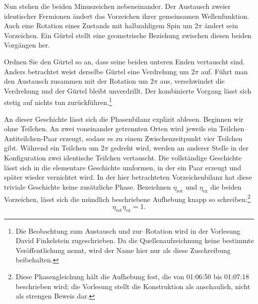 Nun stehen die beiden Minuszeichen nebeneinander. Der Austausch zweier identischer Fermionen ändert das Vorzeichen ihrer gemeinsamen Wellenfunktion. Auch eine Rotation eines Zustands mit halbzahligem Spin um \(2\pi\) ändert sein Vorzeichen. Ein Gürtel stellt eine geometrische Beziehung zwischen diesen beiden Vorgängen her.

Ordnen Sie den Gürtel so an, dass seine beiden unteren Enden vertauscht sind. Anders betrachtet weist derselbe Gürtel eine Verdrehung um \(2\pi\) auf. Führt man den Austausch zusammen mit der Rotation um \(2\pi\) aus, verschwindet die Verdrehung und der Gürtel bleibt unverdrillt. Der kombinierte Vorgang lässt sich stetig auf nichts tun zurückführen.\footnote{Die Beobachtung zum Austausch und zur--Rotation wird in der Vorlesung David Finkelstein zugeschrieben. Da die Quellenaufzeichnung keine bestimmte Veröffentlichung nennt, wird der Name hier nur als diese Zuschreibung beibehalten.}

\begin{classroomqa}
\end{classroomqa}

An dieser Geschichte lässt sich die Phasenbilanz explizit ablesen. Beginnen wir ohne Teilchen. An zwei voneinander getrennten Orten wird jeweils ein Teilchen--Antiteilchen-Paar erzeugt, sodass es zu einem Zwischenzeitpunkt vier Teilchen gibt. Während ein Teilchen um \(2\pi\) gedreht wird, werden an anderer Stelle in der Konfiguration zwei identische Teilchen vertauscht. Die vollständige Geschichte lässt sich in die elementare Geschichte umformen, in der ein Paar erzeugt und später wieder vernichtet wird. In der hier betrachteten Vorzeichenbilanz hat diese triviale Geschichte keine zusätzliche Phase. Bezeichnen \(\eta_{\mathrm{rot}}\) und \(\eta_{\mathrm{ex}}\) die beiden Vorzeichen, lässt sich die mündlich beschriebene Aufhebung knapp so schreiben:\footnote{Diese Phasengleichung hält die Aufhebung fest, die von 01:06:50 bis 01:07:18 beschrieben wird; die Vorlesung stellt die Konstruktion als anschaulich, nicht als strengen Beweis dar.}
\begin{equation}
\eta_{\mathrm{rot}}\eta_{\mathrm{ex}}=1.
\end{equation}

